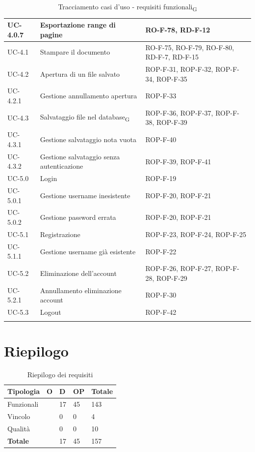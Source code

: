 \documentclass[11pt,a4paper]{article}
\newcommand{\gls}[1]{#1\textsubscript{G}}
\begin{document}
\begin{longtable}{|p{}|p{}|>{\raggedright\arraybackslash}p{}|}
\hline
UC-4.0.7 & Esportazione range di pagine & RO-F-78, RD-F-12 \\
\hline
UC-4.1 & Stampare il documento & RO-F-75, RO-F-79, RO-F-80, RD-F-7, RD-F-15 \\
\hline
UC-4.2 & Apertura di un file salvato & ROP-F-31, ROP-F-32, ROP-F-34, ROP-F-35 \\
\hline
UC-4.2.1 & Gestione annullamento apertura & ROP-F-33 \\
\hline
UC-4.3 & Salvataggio file nel \gls{database} & ROP-F-36, ROP-F-37, ROP-F-38, ROP-F-39 \\
\hline
UC-4.3.1 & Gestione salvataggio nota vuota & ROP-F-40 \\
\hline
UC-4.3.2 & Gestione salvataggio senza autenticazione & ROP-F-39, ROP-F-41 \\
\hline
UC-5.0 & Login & ROP-F-19 \\
\hline
UC-5.0.1 & Gestione username inesistente & ROP-F-20, ROP-F-21 \\
\hline
UC-5.0.2 & Gestione password errata & ROP-F-20, ROP-F-21 \\
\hline
UC-5.1 & Registrazione & ROP-F-23, ROP-F-24, ROP-F-25 \\
\hline
UC-5.1.1 & Gestione username già esistente & ROP-F-22 \\
\hline
UC-5.2 & Eliminazione dell'account & ROP-F-26, ROP-F-27, ROP-F-28, ROP-F-29 \\
\hline
UC-5.2.1 & Annullamento eliminazione account & ROP-F-30 \\
\hline
UC-5.3 & Logout & ROP-F-42 \\
\hline
\addlinespace[1em]
\caption{Tracciamento casi d'uso - \gls{requisiti funzionali}}
\end{longtable}

\newpage

\section{Riepilogo}
\begin{table}[H]
\centering
\begin{tabular}{|p{}|>{\raggedright\arraybackslash}p{}|p{}|p{}|p{}|}
\hline
\textbf{Tipologia} & \textbf{O} & \textbf{D} & \textbf{OP} & \textbf{Totale}\\
\hline
Funzionali & 81 & 17 & 45 & 143 \\
\hline
Vincolo & 4 & 0 & 0 & 4 \\
\hline
Qualità & 10 & 0 & 0 & 10 \\
\hline
\textbf{Totale} & 95 & 17 & 45 & 157 \\
\hline
\end{tabular}
\caption{Riepilogo dei requisiti}
\end{table}
\end{document}
